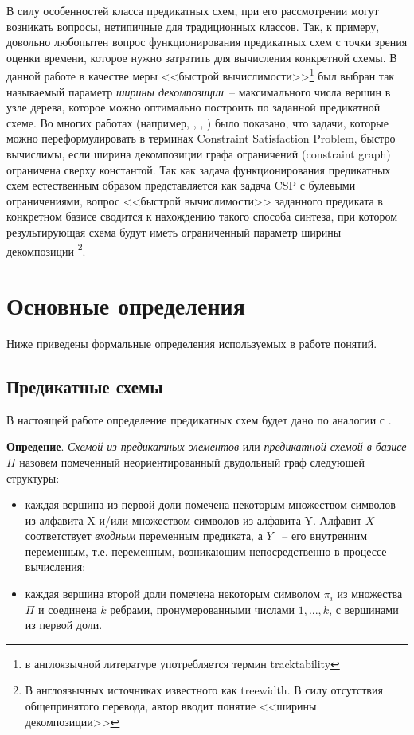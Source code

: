\documentclass[12pt]{article}
\begin{document}
В силу особенностей класса предикатных схем, при его рассмотрении могут возникать вопросы,
нетипичные для традиционных классов. Так, к примеру, довольно любопытен вопрос функционирования предикатных схем с точки зрения оценки времени, которое нужно затратить для
вычисления конкретной схемы. 
В данной работе в качестве меры <<быстрой вычислимости>>\footnote{в англоязычной литературе употребляется термин tracktability}
 был выбран так называемый параметр \textit{ширины декомпозиции}~-- максимального числа вершин в узле дерева, 
которое можно оптимально построить по заданной предикатной схеме. Во многих работах (например, \cite{CSP10}, \cite{Gott10}, \cite{Prosc89}) было 
показано, что задачи, которые можно переформулировать в терминах Constraint Satisfaction Problem, быстро вычислимы, если ширина декомпозиции графа ограничений 
(constraint graph) ограничена сверху константой. 
Так как задача функционирования предикатных схем естественным образом представляется как задача CSP с булевыми ограничениями,
 вопрос <<быстрой вычислимости>> заданного предиката в конкретном базисе сводится к нахождению такого способа синтеза, 
 при котором результирующая схема будут иметь ограниченный параметр ширины декомпозиции
\footnote
{В англоязычных источниках известного как treewidth. В силу отсутствия общепринятого перевода, автор вводит 
понятие <<ширины декомпозиции>>}.

\section{Основные определения}
Ниже приведены формальные определения используемых в работе понятий.

\subsection{Предикатные схемы}

В настоящей работе определение предикатных схем будет дано по аналогии с \cite{Shu11}.

\textbf{Опредение}.
\textit{Схемой из предикатных элементов} или \textit{предикатной схемой в базисе $\Pi$} назовем помеченный
неориентированный двудольный граф следующей структуры:

\begin{itemize}
\item каждая вершина из первой доли помечена некоторым множеством символов из алфавита X и/или 
множеством символов из алфавита Y. 
Алфавит $X$ соответствует \textit{входным} переменным предиката, а $Y$ ~-- его внутренним переменным, 
т.е. переменным, возникающим непосредственно в процессе вычисления; 

\item каждая вершина второй доли помечена некоторым символом $\pi_i$ из множества $\Pi$ и 
соединена $k$ ребрами, пронумерованными числами $1, ..., k$, с вершинами из первой доли.
\end{itemize}
\end{document}

